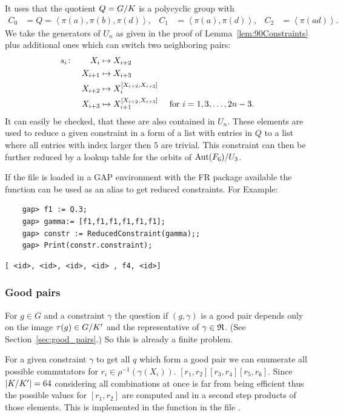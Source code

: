 \documentclass[a4paper,11pt]{amsart}
\begin{document}
It uses that the quotient $Q={G/K}$ is a polycyclic group with 
\begin{align*}
 C_0 &= Q = \left<\pi(a),\pi(b),\pi(d)\right>, &
 C_1 &= \left<\pi(a),\pi(d)\right>, &
 C_2 &= \left<\pi(ad)\right>.
\end{align*}
We take the generators of $U_n$ as given in the proof of
 Lemma~\ref{lem:90Constraints}
plus additional ones which can switch two neighboring pairs:
\begin{align*}
 s_i &\colon &X_i&\mapsto X_{i+2}&\\
	    &&X_{i+1}&\mapsto X_{i+3}&\\
	    &&X_{i+2}&\mapsto X_{i}^{[X_{i+2},X_{i+3}]}&\\
	    &&X_{i+3}&\mapsto X_{i+1}^{[X_{i+2},X_{i+3}]} & \textup{ for }i = 1,3,\dotsc,2n-3.
\end{align*}
It can easily be checked, that these are also contained in $U_n$. 
These elements are used to reduce a given constraint in a form of 
a list with entries in $Q$ to a
list where all entries with index larger then $5$ are trivial. 
This constraint can then be further reduced by a lookup table for the orbits
of ${\operatorname{{Aut}}(F_6)/U_3}$. 

If the file  is loaded in a GAP environment with the FR package available 
the function  can be used as an alias to get 
reduced constraints. For Example:
 \begin{lstlisting}
    gap> f1 := Q.3;
    gap> gamma:= [f1,f1,f1,f1,f1,f1];
    gap> constr := ReducedConstraint(gamma);;
    gap> Print(constr.constraint);
\end{lstlisting} 
\begin{verbatim}
[ <id>, <id>, <id>, <id> , f4, <id>]
\end{verbatim} 

\subsubsection{Good pairs}
For $g\in G$ and a constraint $\gamma$ the question if $(g,\gamma)$ is a good
pair depends only on the image $\tau(g)\in{G/K'}$ and the representative
of $\gamma\in\mathfrak{R}$. (See Section~\ref{sec:good_pairs}.) So this is already a
finite problem. 

For a given constraint $\gamma$ to get all $q$ which form a good pair we can
enumerate all possible commutators for $r_i\in\rho^{-1}(\gamma(X_i))$.
$[r_1,r_2][r_3,r_4][r_5,r_6]$. Since $\lvert{K/K'}\rvert=64$ considering all 
combinations at once is far from being efficient thus the possible values for
$[r_1,r_2]$ are computed and in a second step products of those elements.
This is implemented in the function  in the file
.
\end{document}
